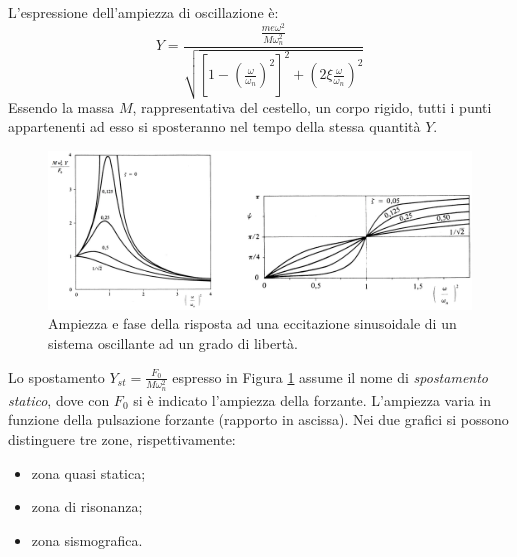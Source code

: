 L'espressione dell'ampiezza di oscillazione è:
\begin{equation}
    Y=\frac{\frac{me\omega^2}{M\omega_n^2}}{\sqrt{{[1-(\frac{\omega}{\omega_n})^2]^2}+(2\xi \frac{\omega}{\omega_n})^2}}
    \label{Ampiezza}
\end{equation}
Essendo la massa $M$, rappresentativa del cestello, un corpo rigido, tutti i punti appartenenti ad esso si sposteranno nel tempo della stessa quantità $Y$. 
\begin{figure}[h]
    \centering
    \includegraphics[width=\textwidth]{Immagini/AmpiezzaEFase.png}
    \caption{Ampiezza e fase della risposta ad una eccitazione sinusoidale di un sistema oscillante ad un grado di libertà.}
    \label{AmpiezzaEfase}
\end{figure}

Lo spostamento $Y_{st}=\frac{F_0}{M\omega_n^2}$ espresso in Figura \ref{AmpiezzaEfase} assume il nome di \textit{spostamento statico}, dove con $F_0$ si è indicato l'ampiezza della forzante. L'ampiezza varia in funzione della pulsazione forzante (rapporto in ascissa). Nei due grafici si possono distinguere tre zone, rispettivamente:
\begin{itemize}
    \item zona quasi statica;
    \item zona di risonanza;
    \item zona sismografica.
\end{itemize}

